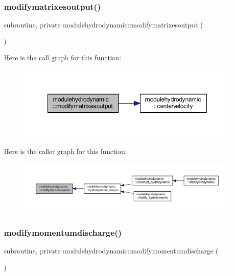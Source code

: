 \subsubsection{\texorpdfstring{modifymatrixesoutput()}{modifymatrixesoutput()}}
{\footnotesize\ttfamily subroutine, private modulehydrodynamic\+::modifymatrixesoutput (\begin{DoxyParamCaption}{ }\end{DoxyParamCaption})\hspace{0.3cm}{\ttfamily [private]}}

Here is the call graph for this function\+:\nopagebreak
\begin{figure}[H]
\begin{center}
\leavevmode
\includegraphics[width=341pt]{namespacemodulehydrodynamic_a855667e612812156b0ef3370781b2665_cgraph}
\end{center}
\end{figure}
Here is the caller graph for this function\+:\nopagebreak
\begin{figure}[H]
\begin{center}
\leavevmode
\includegraphics[width=350pt]{namespacemodulehydrodynamic_a855667e612812156b0ef3370781b2665_icgraph}
\end{center}
\end{figure}
\mbox{\label{namespacemodulehydrodynamic_af3229a2d204d8a2f73afcb48b571d62e}} 
\subsubsection{\texorpdfstring{modifymomentumdischarge()}{modifymomentumdischarge()}}
{\footnotesize\ttfamily subroutine, private modulehydrodynamic\+::modifymomentumdischarge (\begin{DoxyParamCaption}{ }\end{DoxyParamCaption})\hspace{0.3cm}{\ttfamily [private]}}

